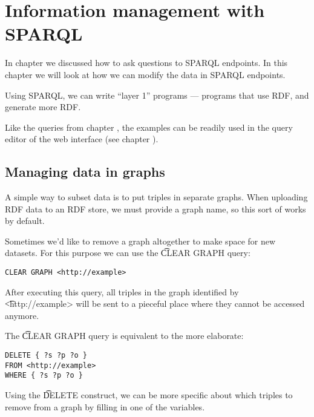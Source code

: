 \chapter{Information management with SPARQL}

  In chapter  we discussed how to ask
  questions to SPARQL endpoints.  In this chapter we will look at how we can
  modify the data in SPARQL endpoints.

  Using SPARQL, we can write ``layer 1'' programs --- programs that use RDF,
  and generate more RDF.

  Like the queries from chapter , the
  examples can be readily used in the query editor of the web interface (see
  chapter ).

\section{Managing data in graphs}

  A simple way to subset data is to put triples in separate graphs.  When
  uploading RDF data to an RDF store, we must provide a graph name, so this
  sort of works by default.

  Sometimes we'd like to remove a graph altogether to make space for new
  datasets.  For this purpose we can use the \t{CLEAR GRAPH} query:

\begin{siderules}
\begin{verbatim}
CLEAR GRAPH <http://example>
\end{verbatim}
\end{siderules}

  After executing this query, all triples in the graph identified by
  \t{<http://example>} will be sent to a pieceful place where they
  cannot be accessed anymore.

  The \t{CLEAR GRAPH} query is equivalent to the more elaborate:

\begin{siderules}
\begin{verbatim}
DELETE { ?s ?p ?o }
FROM <http://example>
WHERE { ?s ?p ?o }
\end{verbatim}
\end{siderules}

  Using the \t{DELETE} construct, we can be more specific about which
  triples to remove from a graph by filling in one of the variables.

